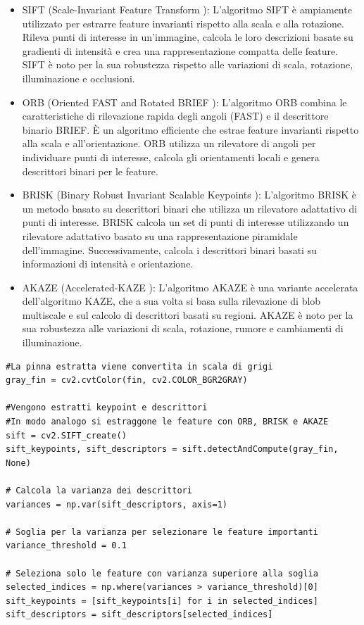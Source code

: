 \documentclass[a4paper,12pt]{report}
\begin{document}
      \begin{itemize}
        \item SIFT (Scale-Invariant Feature Transform \cite{lowe2004distinctive}): L'algoritmo SIFT è ampiamente utilizzato per estrarre feature invarianti rispetto alla scala e alla rotazione. Rileva punti di interesse in un'immagine, calcola le loro descrizioni basate su gradienti di intensità e crea una rappresentazione compatta delle feature. SIFT è noto per la sua robustezza rispetto alle variazioni di scala, rotazione, illuminazione e occlusioni.
        \item ORB (Oriented FAST and Rotated BRIEF \cite{rublee2011orb}): L'algoritmo ORB combina le caratteristiche di rilevazione rapida degli angoli (FAST) e il descrittore binario BRIEF. È un algoritmo efficiente che estrae feature invarianti rispetto alla scala e all'orientazione. ORB utilizza un rilevatore di angoli per individuare punti di interesse, calcola gli orientamenti locali e genera descrittori binari per le feature.
        \newpage
        \item BRISK (Binary Robust Invariant Scalable Keypoints \cite{leutenegger2011brisk}): L'algoritmo BRISK è un metodo basato su descrittori binari che utilizza un rilevatore adattativo di punti di interesse. BRISK calcola un set di punti di interesse utilizzando un rilevatore adattativo basato su una rappresentazione piramidale dell'immagine. Successivamente, calcola i descrittori binari basati su informazioni di intensità e orientazione.
        \item AKAZE (Accelerated-KAZE \cite{alcantarilla2012fast}): L'algoritmo AKAZE è una variante accelerata dell'algoritmo KAZE, che a sua volta si basa sulla rilevazione di blob multiscale e sul calcolo di descrittori basati su regioni. AKAZE è noto per la sua robustezza alle variazioni di scala, rotazione, rumore e cambiamenti di illuminazione.
      \end{itemize}
\begin{lstlisting}
#La pinna estratta viene convertita in scala di grigi
gray_fin = cv2.cvtColor(fin, cv2.COLOR_BGR2GRAY)

#Vengono estratti keypoint e descrittori
#In modo analogo si estraggone le feature con ORB, BRISK e AKAZE
sift = cv2.SIFT_create()
sift_keypoints, sift_descriptors = sift.detectAndCompute(gray_fin, None)

# Calcola la varianza dei descrittori
variances = np.var(sift_descriptors, axis=1)

# Soglia per la varianza per selezionare le feature importanti
variance_threshold = 0.1

# Seleziona solo le feature con varianza superiore alla soglia
selected_indices = np.where(variances > variance_threshold)[0]
sift_keypoints = [sift_keypoints[i] for i in selected_indices]
sift_descriptors = sift_descriptors[selected_indices]
\end{lstlisting}
\end{document}
